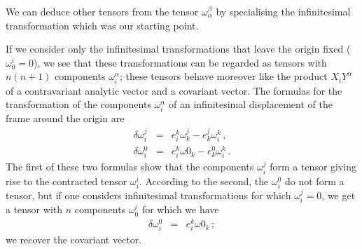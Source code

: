 We can deduce other tensors from the tensor $\omega^\beta_\alpha$ by specialising the infinitesimal transformation which was our starting point.

If we consider only the infinitesimal transformations that leave the origin fixed ($\omega^i_0=0$), we see that these transformations can be regarded as tensors with $n (n + 1)$ components $\omega^\alpha_i$; these tensors behave moreover like the product $X_i Y ^\alpha$ of a contravariant analytic vector and a covariant vector. The formulas for the transformation of the components $\omega^\alpha_i$ of an infinitesimal displacement of the frame  around the origin are
\begin{eqnarray*}
\delta \omega^j_i &=& e^k_i \omega^j_k - e^j_k  \omega^k_i\, , \\
\delta \omega^0_i &=& e^k_i \omega0_k - e^0_k  \omega^k_i\, .
\end{eqnarray*}
The first of these two formulas show that the components $\omega^j_i$ form a tensor giving rise to the contracted tensor $\omega^i_i$. According to the second, the $\omega^0_i$ do not form a tensor, but if one considers infinitesimal transformations for which $\omega^j_i = 0$, we get a tensor with $n$ components $\omega^i_0$ for which we have 
\begin{eqnarray*}
\delta \omega^0_i &=& e^k_i \omega0_k \, ;
\end{eqnarray*}
we recover the covariant vector.




















































